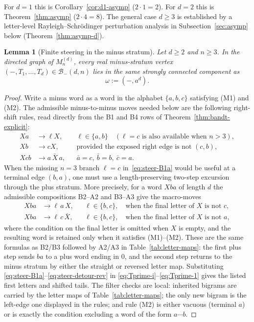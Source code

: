 \documentclass{amsart}
\newtheorem{lemma}[theorem]{Lemma}
\theoremstyle{definition}
\theoremstyle{remark}
\begin{document}
For $d = 1$ this is Corollary~\ref{cor:d1-asymp} ($2 \cdot 1 = 2$).
For $d = 2$ this is Theorem~\ref{thm:asymp} ($2 \cdot 4 = 8$).
The general case $d \ge 3$ is established by a letter-level
Rayleigh--Schr\"odinger perturbation analysis in
Subsection~\ref{sec:asymp} below (Theorem~\ref{thm:asymp-d}).

\begin{lemma}[Finite steering in the minus stratum]
\label{lem:minus-finite-steering}
Let $d\ge2$ and $n\ge3$.  In the directed graph of
$M_n^{(d)}$, every real minus-stratum vertex
$(-,T_1,\ldots,T_d)\in\mathcal{B}_-(d,n)$ lies in the same strongly
connected component as
\[
  \omega := (-,a^d).
\]
\end{lemma}

\begin{proof}
Write a minus word as a word in the alphabet $\{a,b,c\}$ satisfying
\textup{(M1)} and \textup{(M2)}.  The admissible minus-to-minus moves
needed below are the following right-shift rules, read directly from
the B1 and B4 rows of
Theorem~\ref{thm:bandt-explicit}:
\begin{align}
  Xa &\longrightarrow \ell X,
    && \ell\in\{a,b\}
       \quad(\ell=c \text{ is also available when } n>3),\label{eq:steer-B1a}\\
  Xb &\longrightarrow cX,
    && \text{provided the exposed right edge is not }(c,b),\label{eq:steer-B1b}\\
  Xcb &\longrightarrow a\,\bar X\,a,
    && \bar a=c,\ \bar b=b,\ \bar c=a.\label{eq:steer-B4}
\end{align}
When the missing $n=3$ branch $\ell=c$ in~\eqref{eq:steer-B1a}
would be useful at a terminal edge $(b,a)$, one must use a
length-preserving two-step excursion through the plus stratum.  More
precisely, for a word $Xba$ of length $d$ the admissible compositions
B2--A2 and B3--A3 give the macro-moves
\begin{align}
  Xba &\longrightarrow \ell\,a\,X,
     && \ell\in\{b,c\},\quad\text{when the final letter of }X
        \text{ is not }c, \label{eq:steer-detour-straight}\\
  Xba &\longrightarrow \ell\,c\,\bar X,
     && \ell\in\{b,c\},\quad\text{when the final letter of }X
        \text{ is not }a, \label{eq:steer-detour-rev}
\end{align}
where the condition on the final letter is omitted when $X$ is empty,
and the resulting word is retained only when it satisfies
\textup{(M1)}--\textup{(M2)}.  These are the same formulas as B2/B3
followed by A2/A3 in Table~\ref{tab:letter-maps}: the first plus
step sends $ba$ to a plus word ending in $0$, and the second step
returns to the minus stratum by either the straight or reversed
letter map.  Substituting
\eqref{eq:steer-B1a}--\eqref{eq:steer-detour-rev} in
\eqref{eq:Tprime-i}--\eqref{eq:Tprime-1} gives the listed first
letters and shifted tails.  The filter checks are local: inherited
bigrams are carried by the letter maps of Table~\ref{tab:letter-maps};
the only new bigram is the left-edge one displayed in the rules; and
rule \textup{(M2)} is either vacuous (terminal $a$) or is exactly the
condition excluding a word of the form $a\cdots b$.


\end{proof}
\end{document}
